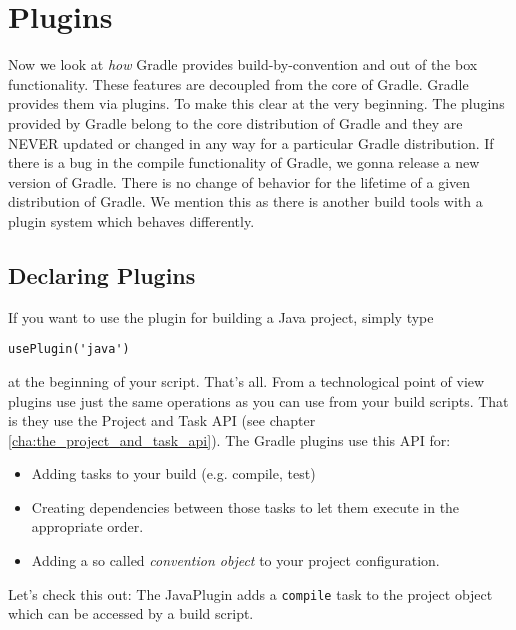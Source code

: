 \chapter{Plugins} %
\label{cha:plugins}
Now we look at \emph{how} Gradle provides build-by-convention and out of the box functionality. These features are decoupled from the core of Gradle. Gradle provides them via plugins. To make this clear at the very beginning. The plugins provided by Gradle belong to the core distribution of Gradle and they are NEVER updated or changed in any way for a particular Gradle distribution. If there is a bug in the compile functionality of Gradle, we gonna release a new version of Gradle. There is no change of behavior for the lifetime of a given distribution of Gradle. We mention this as there is another build tools with a plugin system which behaves differently. 

\section{Declaring Plugins} %
\label{sec:using_plugins}
If you want to use the plugin for building a Java project, simply type
\begin{Verbatim}
usePlugin('java')	
\end{Verbatim}
at the beginning of your script. That's all. From a technological point of view plugins use just the same operations as you can use from your build scripts. That is they use the Project and Task API (see chapter \ref{cha:the_project_and_task_api}). The Gradle plugins use this API for:
\begin{itemize}
	\item Adding tasks to your build (e.g. compile, test)
    \item Creating dependencies between those tasks to let them execute in the appropriate order.
    \item Adding a so called \emph{convention object} to your project configuration.
\end{itemize}
Let's check this out:
The JavaPlugin adds a \texttt{compile} task to the project object which can be accessed by a build script.

